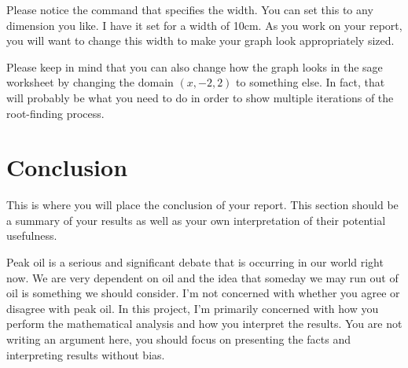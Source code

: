 \documentclass[11pt]{article}
\begin{document}
\begin{report}
Please notice the command that specifies the width. You can set this 
to any dimension you like. I have it set for a width of 10cm. As you 
work on your report, you will want to change this width to make your 
graph look appropriately sized.

Please keep in mind that you can also change how the graph looks in 
the sage worksheet by changing the domain $(x,-2,2)$ to something 
else. In fact, that will probably be what you need to do in order to 
show multiple iterations of the root-finding process.

\section*{Conclusion}
This is where you will place the conclusion of your report. This 
section should be a summary of your results as well as your own 
interpretation of their potential usefulness.

Peak oil is a serious and significant debate that is occurring in 
our world right now. We are very dependent on oil and the idea that 
someday we may run out of oil is something we should consider. I'm 
not concerned with whether you agree or disagree with peak oil. In 
this project, I'm primarily concerned with how you perform the 
mathematical analysis and how you interpret the results. You are not 
writing an argument here, you should focus on presenting the facts 
and interpreting results without bias.

\end{report}
\end{document}
